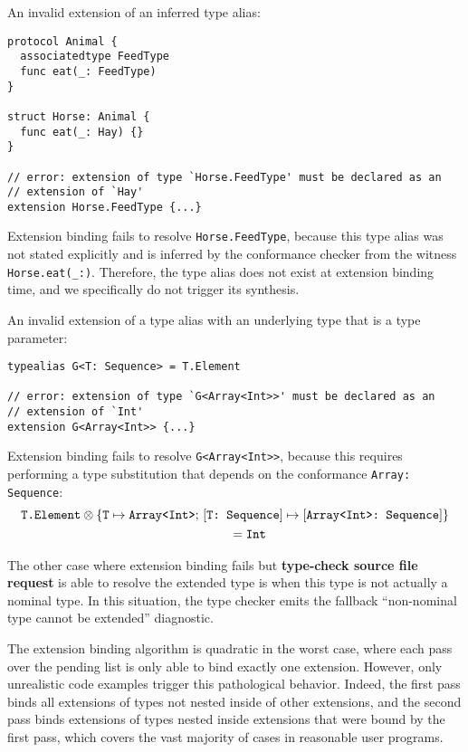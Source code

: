\documentclass[../generics]{subfiles}
\begin{document}
\begin{example}\label{bad extension 1} An invalid extension of an inferred type alias:
\begin{Verbatim}
protocol Animal {
  associatedtype FeedType
  func eat(_: FeedType)
}

struct Horse: Animal {
  func eat(_: Hay) {}
}

// error: extension of type `Horse.FeedType' must be declared as an
// extension of `Hay'
extension Horse.FeedType {...}
\end{Verbatim}
Extension binding fails to resolve \texttt{Horse.FeedType}, because this type alias was not stated explicitly and is inferred by the conformance checker from the witness \verb|Horse.eat(_:)|. Therefore, the type alias does not exist at extension binding time, and we specifically do not trigger its synthesis.
\end{example}
\begin{example}\label{bad extension 2}
An invalid extension of a type alias with an underlying type that is a type parameter:
\begin{Verbatim}
typealias G<T: Sequence> = T.Element

// error: extension of type `G<Array<Int>>' must be declared as an
// extension of `Int'
extension G<Array<Int>> {...}
\end{Verbatim}
Extension binding fails to resolve \texttt{G<Array<Int>>}, because this requires performing a type substitution that depends on the conformance \verb|Array: Sequence|:
\begin{gather*}
\texttt{T.Element}\otimes\{\texttt{T} \mapsto \texttt{Array<Int>};\,[\texttt{T:~Sequence}] \mapsto [\texttt{Array<Int>:~Sequence}]\}\\
\qquad {} =\texttt{Int}
\end{gather*}
\end{example}

The other case where extension binding fails but \textbf{type-check source file request} is able to resolve the extended type is when this type is not actually a nominal type. In this situation, the type checker emits the fallback ``non-nominal type cannot be extended'' diagnostic.

The extension binding algorithm is quadratic in the worst case, where each pass over the pending list is only able to bind exactly one extension. However, only unrealistic code examples trigger this pathological behavior. Indeed, the first pass binds all extensions of types not nested inside of other extensions, and the second pass binds extensions of types nested inside extensions that were bound by the first pass, which covers the vast majority of cases in reasonable user programs.
\end{document}
